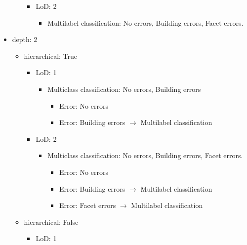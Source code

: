 \documentclass[../main.tex]{subfile}
\begin{document}
\begin{itemize}
\begin{itemize}
\begin{itemize}
\begin{itemize}
                \end{itemize}
                \item LoD\@: 2
                \begin{itemize}
                    \item Multilabel classification: No errors, Building errors, Facet errors.
                \end{itemize}
            \end{itemize}
        \end{itemize}
        \item depth: 2
        \begin{itemize}
            \item hierarchical: True
            \begin{itemize}
                \item LoD\@: 1
                \begin{itemize}
                    \item Multiclass classification: No errors, Building errors
                    \begin{itemize}
                        \item Error: No errors
                        \item Error: Building errors $\longrightarrow$ Multilabel classification
                    \end{itemize}
                \end{itemize}
                \item LoD\@: 2
                \begin{itemize}
                    \item Multiclass classification: No errors, Building errors, Facet errors.
                    \begin{itemize}
                        \item Error: No errors
                        \item Error: Building errors $\longrightarrow$ Multilabel classification
                        \item Error: Facet errors $\longrightarrow$ Multilabel classification
                    \end{itemize}
                \end{itemize}
            \end{itemize}
            \item hierarchical: False
            \begin{itemize}
                \item LoD\@: 1

\end{itemize}
\end{itemize}
\end{itemize}
\end{document}
